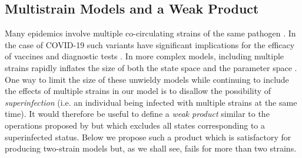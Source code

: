 \documentclass[pdflatex,sn-basic]{sn-jnl}%
\theoremstyle{definition}
\begin{document}
\subsection{Multistrain Models and a Weak Product}\label{wp}
Many epidemics involve multiple co-circulating strains of the same pathogen \citep{gog2002dynamics, williams2021localization}. In the case of COVID-19 such variants have significant implications for the efficacy of vaccines\citep{abu2021effectiveness, koyama2020emergence} and diagnostic tests \citep{vasireddy2021review}. In more complex models, including multiple strains rapidly inflates the size of both the state space and the parameter space \citep{kryazhimskiy2007state}. One way to limit the size of these unwieldy models while continuing to include the effects of multiple strains in our model is to disallow the possibility of \emph{superinfection} (i.e. an individual being infected with multiple strains at the same time). It would therefore be useful to define a \emph{weak product} similar to the operations proposed by \cite{worden2017products} but which excludes all states corresponding to a superinfected status. Below we propose such a product which is satisfactory for producing two-strain models but, as we shall see, fails for more than two strains.
\end{document}
